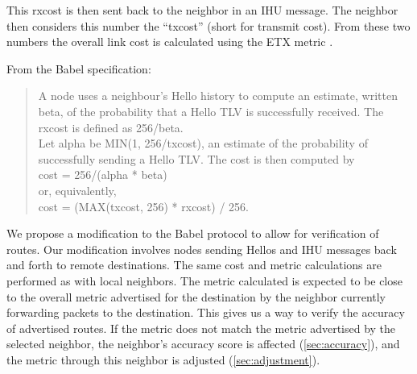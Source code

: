 \documentclass[11pt]{article}
\newlength{\currentparskip}
\newenvironment{unbreakable}
  {\setlength{\currentparskip}{\parskip}%
	 \vspace{\currentparskip}
   \begin{minipage}{\textwidth}%
   \setlength{\parskip}{\currentparskip}%
  }
  {\end{minipage}\vspace{\currentparskip}}
\begin{document}
This rxcost is then sent back to the neighbor in an IHU message. The neighbor then considers this number the ``txcost'' (short for transmit cost). From these two numbers the overall link cost is calculated using the ETX metric \cite{etx}.

\begin{unbreakable}
From the Babel specification:
\begin{quote}
A node uses a neighbour's Hello history to compute an estimate,
written beta, of the probability that a Hello TLV is successfully
received.  The rxcost is defined as 256/beta.\\

Let alpha be MIN(1, 256/txcost), an estimate of the probability of
successfully sending a Hello TLV.  The cost is then computed by\\

   cost = 256/(alpha * beta)\\

or, equivalently,\\

   cost = (MAX(txcost, 256) * rxcost) / 256.\\

\end{quote}
\end{unbreakable}

We propose a modification to the Babel protocol to allow for verification of routes. Our modification involves nodes sending Hellos and IHU messages back and forth to remote destinations. The same cost and metric calculations are performed as with local neighbors. The metric calculated is expected to be close to the overall metric advertised for the destination by the neighbor currently forwarding packets to the destination. This gives us a way to verify the accuracy of advertised routes. If the metric does not match the metric advertised by the selected neighbor, the neighbor’s accuracy score is affected (\autoref{sec:accuracy}), and the metric through this neighbor is adjusted (\autoref{sec:adjustment}).
\end{document}
